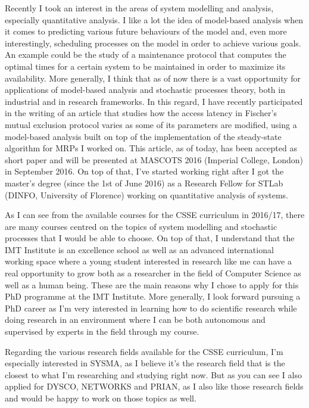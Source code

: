\documentclass{article}
\begin{document}
    Recently I took an interest in the areas of system modelling and analysis, especially quantitative analysis. I like a lot the idea of model-based analysis when it comes to predicting various future behaviours of the model and, even more interestingly, scheduling processes on the model in order to achieve various goals. An example could be the study of a maintenance protocol that computes the optimal times for a certain system to be maintained in order to maximize its availability. More generally, I think that as of now there is a vast opportunity for applications of model-based analysis and stochastic processes theory, both in industrial and in research frameworks. In this regard, I have recently participated in the writing of an article that studies how the access latency in Fischer's mutual exclusion protocol varies as some of its parameters are modified, using a model-based analysis built on top of the implementation of the steady-state algorithm for MRPs I worked on. This article, as of today, has been accepted as short paper and will be presented at MASCOTS 2016 (Imperial College, London) in September 2016. On top of that, I've started working right after I got the master's degree (since the 1st of June 2016) as a Research Fellow for STLab (DINFO, University of Florence) working on quantitative analysis of systems. \par \bigskip
    
    As I can see from the available courses for the CSSE curriculum in 2016/17, there are many courses centred on the topics of system modelling and stochastic processes that I would be able to choose. On top of that, I understand that the IMT Institute is an excellence school as well as an advanced international working space where a young student interested in research like me can have a real opportunity to grow both as a researcher in the field of Computer Science as well as a human being. These are the main reasons why I chose to apply for this PhD programme at the IMT Institute. More generally, I look forward pursuing a PhD career as I'm very interested in learning how to do scientific research while doing research in an environment where I can be both autonomous and supervised by experts in the field through my course. \par \bigskip
    
    Regarding the various research fields available for the CSSE curriculum, I'm especially interested in SYSMA, as I believe it's the research field that is the closest to what I'm researching and studying right now. But as you can see I also applied for DYSCO, NETWORKS and PRIAN, as I also like those research fields and would be happy to work on those topics as well. \par \bigskip
    
\end{document}
